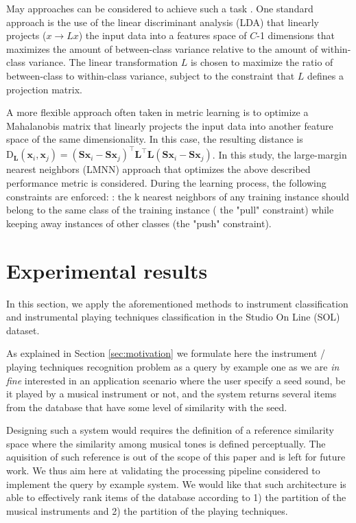 \documentclass{article}
\begin{document}
May approaches can be considered to achieve such a task \cite{bellet2013survey}. One standard approach is the use of the linear discriminant analysis (LDA) that linearly projects ($x \rightarrow L x$) the input data into a features space of $C$-1 dimensions that maximizes the amount of between-class variance
relative to the amount of within-class variance. The linear transformation $L$ is chosen to maximize the ratio of between-class to within-class variance,
subject to the constraint that $L$ defines a projection matrix.


A more flexible approach often taken in metric learning is to optimize a Mahalanobis matrix that linearly projects the input data into another feature space of the same dimensionality. In this case, the resulting distance is $\mathrm{D}_\mathbf{L}(\boldsymbol{x}_i, \boldsymbol{x}_j) = (\mathbf{S}\boldsymbol{x}_i - \mathbf{S}\boldsymbol{x}_j)^{\top}  \mathbf{L}^{\top} \mathbf{L} (\mathbf{S}\boldsymbol{x}_i-\mathbf{S}\boldsymbol{x}_j)$.
In this study, the large-margin nearest neighbors (LMNN) approach \cite{weinberger2006nips, weinberger2009jmlr} that optimizes the above described performance metric is considered. During the learning process, the following constraints are enforced: : the
k nearest neighbors of any training instance should belong to the
same class of the training instance ( the "pull" constraint) while keeping away instances of other classes (the "push" constraint).



\section{Experimental results} \label{sec:exp}
In this section, we apply the aforementioned methods to instrument classification and instrumental playing techniques classification in the Studio On Line (SOL) dataset.

As explained in Section \ref{sec:motivation} we formulate here the instrument / playing techniques recognition problem as a query by example one as we are \textit{in fine} interested in an application scenario where the user specify a seed sound, be it played by a musical instrument or not, and the system returns several items from the database that have some level of similarity with the seed.

Designing such a system would requires the definition of a reference similarity space where the similarity among musical tones is defined perceptually. The aquisition of such reference is out of the scope of this paper and is left for future work. We thus aim here at validating the processing pipeline considered to implement the query by example system. We would like that such architecture is able to effectively rank items of the database according to 1) the partition of the musical instruments and 2) the partition of the playing techniques.
\end{document}

